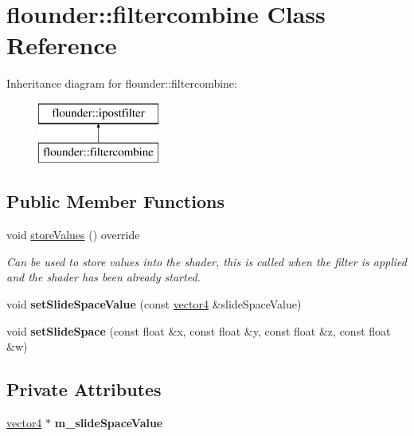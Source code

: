 \hypertarget{classflounder_1_1filtercombine}{}\section{flounder\+:\+:filtercombine Class Reference}
\label{classflounder_1_1filtercombine}
Inheritance diagram for flounder\+:\+:filtercombine\+:\begin{figure}[H]
\begin{center}
\leavevmode
\includegraphics[height=2.000000cm]{classflounder_1_1filtercombine}
\end{center}
\end{figure}
\subsection*{Public Member Functions}
\begin{DoxyCompactItemize}
\item 
void \hyperlink{classflounder_1_1filtercombine_a0ec0634422d3ed539045d9fcfa3d119e}{store\+Values} () override
\begin{DoxyCompactList}\small\item\em Can be used to store values into the shader, this is called when the filter is applied and the shader has been already started. \end{DoxyCompactList}\item 
\mbox{\label{classflounder_1_1filtercombine_acc8abe49dfbe2c04ffae152e3fc5306f}} 
void {\bfseries set\+Slide\+Space\+Value} (const \hyperlink{classflounder_1_1vector4}{vector4} \&slide\+Space\+Value)
\item 
\mbox{\label{classflounder_1_1filtercombine_a14cb86373ccc0ba66bc6ce485806589d}} 
void {\bfseries set\+Slide\+Space} (const float \&x, const float \&y, const float \&z, const float \&w)
\end{DoxyCompactItemize}
\subsection*{Private Attributes}
\begin{DoxyCompactItemize}
\item 
\mbox{\label{classflounder_1_1filtercombine_a54359b6adfe0a65305325202de649bfe}} 
\hyperlink{classflounder_1_1vector4}{vector4} $\ast$ {\bfseries m\+\_\+slide\+Space\+Value}
\end{DoxyCompactItemize}
